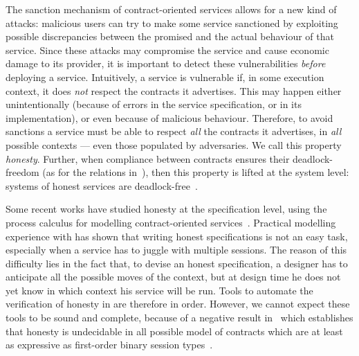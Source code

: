 The sanction mechanism of contract-oriented services
allows for a new kind of attacks: 
malicious users can try
to make some service sanctioned by exploiting possible discrepancies between
the promised and the actual behaviour of that service. %
Since these attacks may compromise the service and cause economic damage to its provider,
it is important to detect these vulnerabilities \emph{before} deploying a service. %
Intuitively, a service is vulnerable if, 
in some execution context,
it does \emph{not} respect the contracts it advertises.
This may happen either unintentionally
(because of errors in the service specification, or in its implementation),
or even because of malicious behaviour.
Therefore, to avoid sanctions a service must be able
to respect \emph{all} the contracts it advertises, in \emph{all} possible contexts
--- even those populated by adversaries.
We call this property \emph{honesty}.
Further, when compliance between contracts ensures their deadlock-freedom 
(as for the relations in~\cite{Acciai10coordination,Barbanera10ppdp,BSZ14concur,Laneve07concur,Rensink07infoco}),
then this property is lifted at the system level:
systems of honest services are deadlock-free~\cite{BZ15wsfm}.

Some recent works have studied honesty at the specification level, 
using the process calculus \coco for modelling contract-oriented services~\cite{BMSZ15jlamp,BTZ12sacs,BZ15wsfm}.
Practical modelling experience with \coco has shown that writing honest specifications
is not an easy task, especially when a service has to juggle with multiple sessions.
The reason of this difficulty lies in the fact that,
to devise an honest specification, 
a designer has to anticipate all the possible moves of the context,
but at design time he does not yet know in which context his service will be run.
%
Tools to automate the verification of honesty in \coco are therefore in order.
However, we cannot expect these tools to be sound and complete,
because of a negative result in~\cite{BZ15wsfm} which establishes that
honesty is undecidable 
in all possible model of contracts which are at least as expressive
as first-order binary session types~\cite{Honda98esop}.

